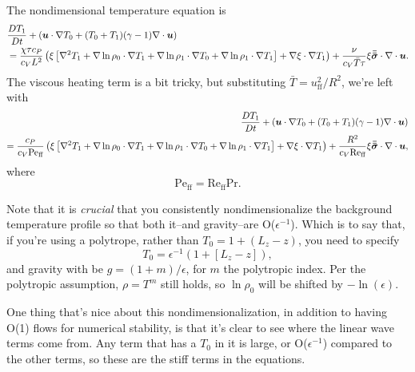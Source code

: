 The nondimensional temperature equation is
\begin{gather}
\begin{split}
&\frac{D T_1}{Dt} + \left(\bm{u}\cdot\nabla T_0 + (T_0 + T_1)(\gamma-1)\nabla\cdot\bm{u}\right)
\\
&= \frac{\chi \tau c_P}{c_V L^2}\left(\xi\left[\nabla^2 T_1 + \nabla\ln\rho_0\cdot\nabla T_1 + \nabla\ln\rho_1 \cdot\nabla T_0 + \nabla\ln\rho_1\cdot\nabla T_1\right] + \nabla\xi\cdot\nabla T_1\right)
 + \frac{\nu}{c_V \bar{T} \tau }\xi\bm{\bar{\bar{\sigma}}}\cdot\nabla\cdot\bm{u}.
\end{split}
\end{gather}
The viscous heating term is a bit tricky, but substituting $\bar{T} = u_{\text{ff}}^2/R^2$, we're left with
\begin{equation}
\begin{split}
\frac{D T_1}{Dt} + \left(\bm{u}\cdot\nabla T_0 + (T_0 + T_1)(\gamma-1)\nabla\cdot\bm{u}\right)
\\= \frac{c_P}{c_V \text{Pe}_{\text{ff}}}\left(\xi\left[\nabla^2 T_1 + \nabla\ln\rho_0\cdot\nabla T_1 + \nabla\ln\rho_1 \cdot\nabla T_0 + \nabla\ln\rho_1\cdot\nabla T_1\right] + \nabla\xi\cdot\nabla T_1\right)
 + \frac{R^2}{c_V \text{Re}_{\text{ff}} }\xi\bm{\bar{\bar{\sigma}}}\cdot\nabla\cdot\bm{u},
\end{split}
\end{equation}
where
$$
\text{Pe}_{\text{ff}} = \text{Re}_{\text{ff}}\text{Pr}.
$$

Note that it is \emph{crucial} that you consistently nondimensionalize the background temperature profile so that both it--and gravity--are O($\epsilon^{-1}$).
Which is to say that, if you're using a polytrope, rather than $T_0 = 1 + (L_z - z)$, you need to specify
$$
T_0 = \epsilon^{-1}\left(1 + [L_z - z]\right),
$$
and gravity with be $g = (1 + m)/\epsilon$, for $m$ the polytropic index.
Per the polytropic assumption, $\rho = T^m$ still holds, so $\ln\rho_0$ will be shifted by $-\ln(\epsilon)$.

One thing that's nice about this nondimensionalization, in addition to having O(1) flows for numerical stability, is that it's clear to see where the linear wave terms come from.
Any term that has a $T_0$ in it is large, or O($\epsilon^{-1}$) compared to the other terms, so these are the stiff terms in the equations.


